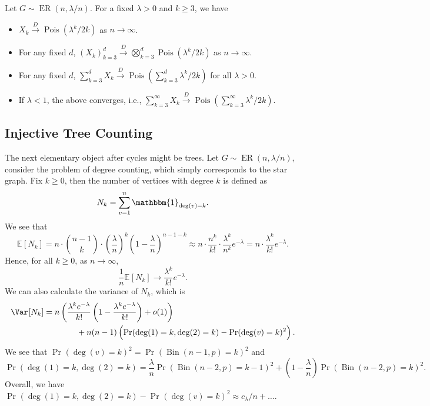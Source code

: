 \begin{theorem}\label{thm:Erdős-Rényi-cycle-counting}
	Let \(G \sim \operatorname{ER}(n, \lambda / n) \). For a fixed \(\lambda > 0\) and \(k \geq 3\), we have
	\begin{itemize}
		\item \(X_k \overset{D}{\to} \operatorname{Pois}(\lambda ^k / 2k) \) as \(n \to \infty \).
		\item For any fixed \(d\), \((X_k)_{k = 3}^d \overset{D}{\to} \bigotimes_{k=3}^d \operatorname{Pois}(\lambda ^k / 2k) \) as \(n \to \infty \).
		\item For any fixed \(d\), \(\sum_{k=3}^{d} X_k \overset{D}{\to} \operatorname{Pois}(\sum_{k=3}^{d} \lambda ^k / 2k) \) for all \(\lambda > 0\).
		\item If \(\lambda < 1\), the above converges, i.e., \(\sum_{k=3}^{\infty} X_k \overset{D}{\to} \operatorname{Pois}(\sum_{k=3}^{\infty} \lambda ^k / 2k) \).
	\end{itemize}
\end{theorem}

\subsection{Injective Tree Counting}
The next elementary object after cycles might be trees. Let \(G \sim \operatorname{ER}(n, \lambda / n) \), consider the problem of degree counting, which simply corresponds to the star graph. Fix \(k \geq 0\), then the number of vertices with degree \(k\) is defined as
\[
	N_k = \sum_{v=1}^{n} \mathbbm{1}_{\deg (v) = k}.
\]
We see that
\begin{equation}\label{eq:Erdős-Rényi-degree-counting-mean}
	\mathbb{E}_{}[N_k]
	= n \cdot \binom{n-1}{k} \cdot \left( \frac{\lambda}{n} \right) ^k \left( 1 - \frac{\lambda}{n} \right) ^{n-1-k}
	\approx n \cdot \frac{n^k}{k!} \cdot \frac{\lambda ^k}{n^k} e^{-\lambda }
	= n \cdot \frac{\lambda ^k}{k!} e^{-\lambda }.
\end{equation}
Hence, for all \(k \geq 0\), as \(n \to \infty \),
\[
	\frac{1}{n} \mathbb{E}_{}[N_k]
	\to \frac{\lambda ^k}{k!} e^{-\lambda }.
\]
We can also calculate the variance of \(N_k\), which is
\begin{equation}\label{eq:Erdős-Rényi-degree-counting-variance}
	\begin{split}
		\Var_{}[N_k]
		 & = n \left( \frac{\lambda ^k e^{-\lambda }}{k!} \left( 1 - \frac{\lambda ^k e^{-\lambda }}{k!} \right) + o(1) \right) \\
		 & \qquad\qquad + n(n-1) \left( \Pr_{}(\deg (1) = k, \deg (2) = k) - \Pr_{}(\deg (v) = k)^2 \right).
	\end{split}
\end{equation}
We see that \(\Pr_{}(\deg (v) = k)^2 = \Pr_{}(\operatorname{Bin}(n-1, p) =k)^2\) and
\[
	\Pr_{}(\deg (1) = k, \deg (2) = k)
	= \frac{\lambda}{n} \Pr_{}(\operatorname{Bin}(n-2, p) = k-1 ) ^2 + \left( 1 - \frac{\lambda}{n} \right) \Pr_{}(\operatorname{Bin}(n-2, p) = k )^2.
\]
Overall, we have \(\Pr_{}(\deg (1) = k, \deg (2) = k) - \Pr_{}(\deg (v) = k)^2 \approx c_\lambda / n + \dots \).

